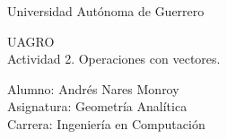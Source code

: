 \documentclass[11pt,a4paper]{article}
\begin{document}
\begin{center}
{\Huge Universidad Autónoma de Guerrero}
\vspace{2cm}

\begin{huge}
UAGRO\\
\vspace{2cm}
Actividad 2. Operaciones con vectores.
\end{huge}
\end{center}
\vspace{3cm}
\begin{flushleft}
\begin{LARGE}
Alumno: Andrés Nares Monroy  \\
Asignatura: Geometría Analítica \\
Carrera: Ingeniería en Computación \\
\end{LARGE}
\end{flushleft}
\newpage
\end{document}
